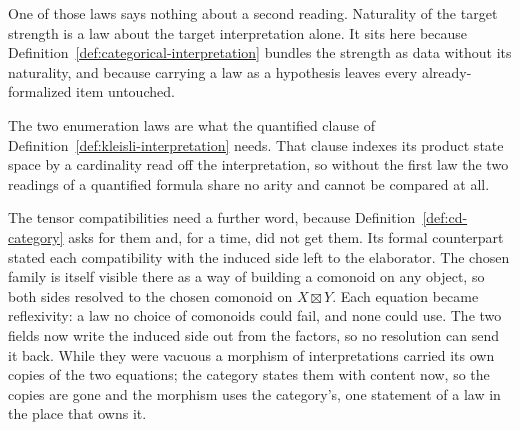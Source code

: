One of those laws says nothing about a second reading. Naturality of the
target strength is a law about the target interpretation alone. It sits
here because Definition~\ref{def:categorical-interpretation} bundles the
strength as data without its naturality, and because carrying a law as a
hypothesis leaves every already-formalized item untouched.

The two enumeration laws are what the quantified clause of
Definition~\ref{def:kleisli-interpretation} needs. That clause indexes its
product state space by a cardinality read off the interpretation, so
without the first law the two readings of a quantified formula share no
arity and cannot be compared at all.

The tensor compatibilities need a further word, because
Definition~\ref{def:cd-category} asks for them and, for a time, did not
get them. Its formal counterpart stated each compatibility with the
induced side left to the elaborator. The chosen family is itself visible
there as a way of building a comonoid on any object, so both sides
resolved to the chosen comonoid on $X \boxtimes Y$. Each equation
became reflexivity: a law no choice of comonoids could fail, and none
could use. The two fields now write the induced side out from the
factors, so no resolution can send it back. While they were vacuous a
morphism of interpretations carried its own copies of the two equations;
the category states them with content now, so the copies are gone and the
morphism uses the category's, one statement of a law in the place that
owns it.

